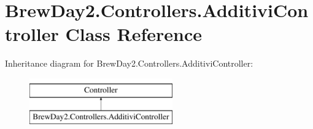 \hypertarget{class_brew_day2_1_1_controllers_1_1_additivi_controller}{}\section{Brew\+Day2.\+Controllers.\+Additivi\+Controller Class Reference}
\label{class_brew_day2_1_1_controllers_1_1_additivi_controller}
Inheritance diagram for Brew\+Day2.\+Controllers.\+Additivi\+Controller\+:\begin{figure}[H]
\begin{center}
\leavevmode
\includegraphics[height=2.000000cm]{class_brew_day2_1_1_controllers_1_1_additivi_controller}
\end{center}
\end{figure}
